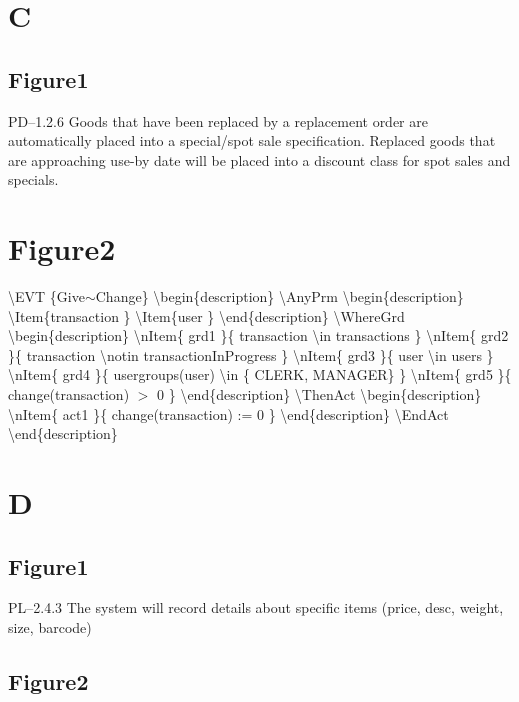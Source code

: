 \section{C}
\label{c}

\subsection{Figure1}
\label{figure1}

PD--1.2.6 Goods that have been replaced by a replacement order are automatically placed into a special\slash spot sale specification.
Replaced goods that are approaching use-by date will be placed into a discount class for spot sales and specials.

\section{Figure2}
\label{figure2}

\textbackslash{}EVT \{Give\ensuremath{\sim}Change\}
\textbackslash{}begin\{description\}
\textbackslash{}AnyPrm
\textbackslash{}begin\{description\}
\textbackslash{}Item\{transaction \}
\textbackslash{}Item\{user \}
\textbackslash{}end\{description\}
\textbackslash{}WhereGrd
\textbackslash{}begin\{description\}
\textbackslash{}nItem\{ grd1 \}\{ transaction \textbackslash{}in transactions \}
\textbackslash{}nItem\{ grd2 \}\{ transaction \textbackslash{}notin transactionInProgress \}
\textbackslash{}nItem\{ grd3 \}\{ user \textbackslash{}in users \}
\textbackslash{}nItem\{ grd4 \}\{ usergroups(user) \textbackslash{}in \{ CLERK, MANAGER\} \}
\textbackslash{}nItem\{ grd5 \}\{ change(transaction) $>$ 0 \}
\textbackslash{}end\{description\}
\textbackslash{}ThenAct
\textbackslash{}begin\{description\}
\textbackslash{}nItem\{ act1 \}\{ change(transaction) := 0 \}
\textbackslash{}end\{description\}
\textbackslash{}EndAct
\textbackslash{}end\{description\}

\section{D}
\label{d}

\subsection{Figure1}
\label{figure1}

PL--2.4.3 The system will record details about specific items (price, desc, weight, size, barcode)

\subsection{Figure2}
\label{figure2}

